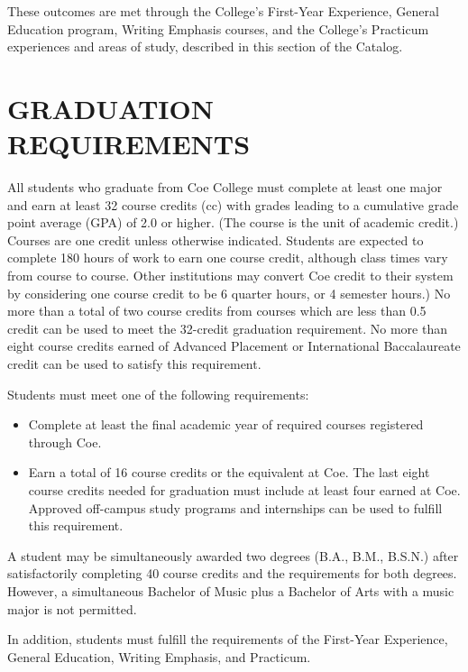 \documentclass[
  letterpaper,
]{scrbook}
\providecommand{\tightlist}{%
  \setlength{\itemsep}{0pt}\setlength{\parskip}{0pt}}
\begin{document}
These outcomes are met through the College's First-Year Experience,
General Education program, Writing Emphasis courses, and the College's
Practicum experiences and areas of study, described in this section of
the Catalog.

\hypertarget{sec-graduation-requirements}{%
\chapter{GRADUATION REQUIREMENTS}\label{sec-graduation-requirements}}

All students who graduate from Coe College must complete at least one
major and earn at least 32 course credits (cc) with grades leading to a
cumulative grade point average (GPA) of 2.0 or higher. (The course is
the unit of academic credit.) Courses are one credit unless otherwise
indicated. Students are expected to complete 180 hours of work to earn
one course credit, although class times vary from course to course.
Other institutions may convert Coe credit to their system by considering
one course credit to be 6 quarter hours, or 4 semester hours.) No more
than a total of two course credits from courses which are less than 0.5
credit can be used to meet the 32-credit graduation requirement. No more
than eight course credits earned of Advanced Placement or International
Baccalaureate credit can be used to satisfy this requirement.

Students must meet one of the following requirements:

\begin{itemize}
\tightlist
\item
  Complete at least the final academic year of required courses
  registered through Coe.
\item
  Earn a total of 16 course credits or the equivalent at Coe. The last
  eight course credits needed for graduation must include at least four
  earned at Coe. Approved off-campus study programs and internships can
  be used to fulfill this requirement.
\end{itemize}

A student may be simultaneously awarded two degrees (B.A., B.M., B.S.N.)
after satisfactorily completing 40 course credits and the requirements
for both degrees. However, a simultaneous Bachelor of Music plus a
Bachelor of Arts with a music major is not permitted.

In addition, students must fulfill the requirements of the First-Year
Experience, General Education, Writing Emphasis, and Practicum.
\end{document}

